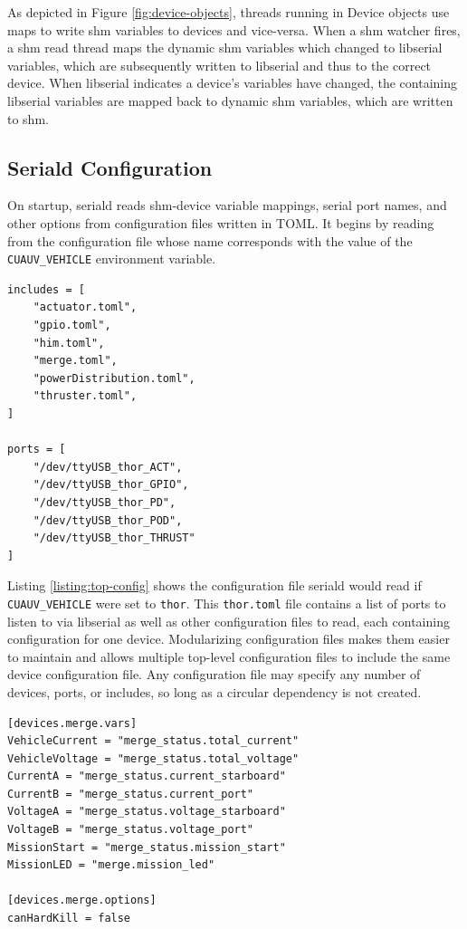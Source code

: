 \documentclass[11pt]{article}
\begin{document}
As depicted in Figure \ref{fig:device-objects}, threads running in Device objects use maps to write shm variables to devices and vice-versa. When a shm watcher fires, a shm read thread maps the dynamic shm variables which changed to libserial variables, which are subsequently written to libserial and thus to the correct device. When libserial indicates a device's variables have changed, the containing libserial variables are mapped back to dynamic shm variables, which are written to shm.

\subsection{Seriald Configuration}

On startup, seriald reads shm-device variable mappings, serial port names, and other options from configuration files written in TOML. It begins by reading from the configuration file whose name corresponds with the value of the \texttt{CUAUV\_VEHICLE} environment variable.

\begin{listing}
\begin{verbatim}
includes = [
	"actuator.toml",
	"gpio.toml",
	"him.toml",
	"merge.toml",
	"powerDistribution.toml",
	"thruster.toml",
]

ports = [
	"/dev/ttyUSB_thor_ACT",
	"/dev/ttyUSB_thor_GPIO",
	"/dev/ttyUSB_thor_PD",
	"/dev/ttyUSB_thor_POD",
	"/dev/ttyUSB_thor_THRUST"
]
\end{verbatim}
\caption{\texttt{thor.toml}, Example Top-Level Config}
\label{listing:top-config}
\end{listing}

Listing \ref{listing:top-config} shows the configuration file seriald would read if \texttt{CUAUV\_VEHICLE} were set to \texttt{thor}. This \texttt{thor.toml} file contains a list of ports to listen to via libserial as well as other configuration files to read, each containing configuration for one device. Modularizing configuration files makes them easier to maintain and allows multiple top-level configuration files to include the same device configuration file. Any configuration file may specify any number of devices, ports, or includes, so long as a circular dependency is not created.

\begin{listing}
\begin{verbatim}
[devices.merge.vars]
VehicleCurrent = "merge_status.total_current"
VehicleVoltage = "merge_status.total_voltage"
CurrentA = "merge_status.current_starboard"
CurrentB = "merge_status.current_port"
VoltageA = "merge_status.voltage_starboard"
VoltageB = "merge_status.voltage_port"
MissionStart = "merge_status.mission_start"
MissionLED = "merge.mission_led"

[devices.merge.options]
canHardKill = false
\end{verbatim}
\caption{\texttt{merge.toml}, Example Device Config}
\label{listing:device-config}
\end{listing}
\end{document}
